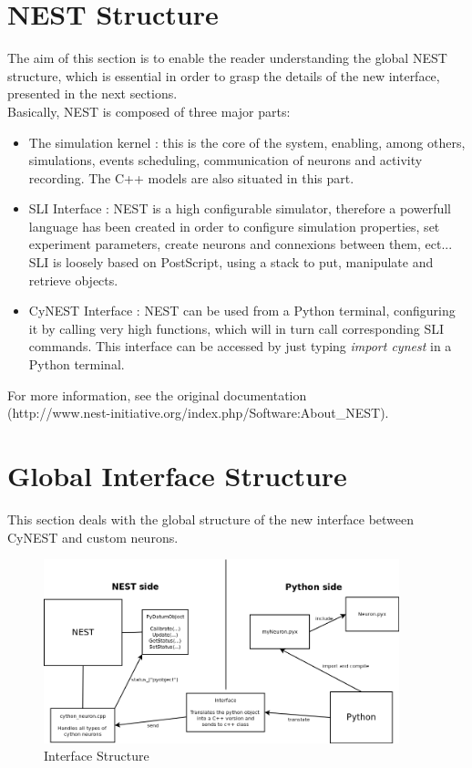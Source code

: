 \documentclass{article}
\begin{document}
\section{NEST Structure}
The aim of this section is to enable the reader understanding the global NEST structure, which is essential in order to grasp the details of the new interface, presented in the next sections.\\
Basically, NEST is composed of three major parts:
\begin{itemize}
\item The simulation kernel : this is the core of the system, enabling, among others, simulations, events scheduling, communication of neurons and activity recording. The C++ models are also situated in this part.
\item SLI Interface : NEST is a high configurable simulator, therefore a powerfull language has been created in order to configure simulation properties, set experiment parameters, create neurons and connexions between them, ect... SLI is loosely based on PostScript, using a stack to put, manipulate and retrieve objects.
\item CyNEST Interface : NEST can be used from a Python terminal, configuring it by calling very high functions, which will in turn call corresponding SLI commands. This interface can be accessed by just typing \emph{import cynest} in a Python terminal.
\end{itemize}
For more information, see the original documentation\\ (http://www.nest-initiative.org/index.php/Software:About\_NEST).

\section{Global Interface Structure}
This section deals with the global structure of the new interface between CyNEST and custom neurons. 

\begin{figure}[h]
\begin{center}
\includegraphics[width=0.92\textwidth]{Ressources/Interface_Structure}
\caption{Interface Structure}
\end{center}
\end{figure}
\end{document}

